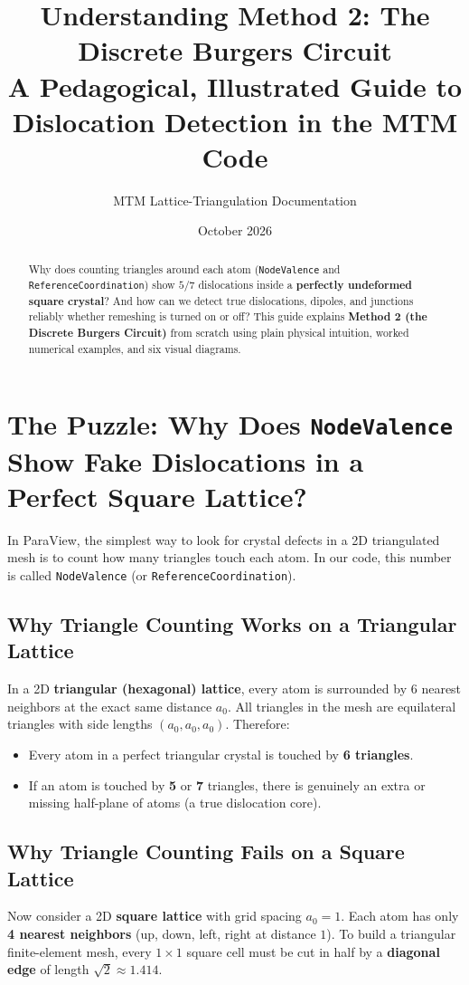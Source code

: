 \documentclass[11pt,a4paper]{article}
\title{\textbf{Understanding Method 2: The Discrete Burgers Circuit}\\[6pt]
\large A Pedagogical, Illustrated Guide to Dislocation Detection in the MTM Code}
\author{MTM Lattice-Triangulation Documentation}
\date{October 2026}
\newcommand{\code}[1]{\texttt{#1}}
\begin{document}
\maketitle

\begin{abstract}
\noindent
Why does counting triangles around each atom (\code{NodeValence} and \code{ReferenceCoordination})
show $5/7$ dislocations inside a \textbf{perfectly undeformed square crystal}? And how can we detect
true dislocations, dipoles, and junctions reliably whether remeshing is turned on or off?
This guide explains \textbf{Method 2 (the Discrete Burgers Circuit)} from scratch using plain
physical intuition, worked numerical examples, and six visual diagrams.
\end{abstract}

\tableofcontents
\newpage

\section{The Puzzle: Why Does \code{NodeValence} Show Fake Dislocations in a Perfect Square Lattice?}

In ParaView, the simplest way to look for crystal defects in a 2D triangulated mesh is to count
how many triangles touch each atom. In our code, this number is called \code{NodeValence} (or
\code{ReferenceCoordination}).

\subsection{Why Triangle Counting Works on a Triangular Lattice}
In a 2D \textbf{triangular (hexagonal) lattice}, every atom is surrounded by $6$ nearest neighbors at
the exact same distance $a_0$. All triangles in the mesh are equilateral triangles with side lengths
$(a_0, a_0, a_0)$. Therefore:
\begin{itemize}[noitemsep]
  \item Every atom in a perfect triangular crystal is touched by \textbf{6 triangles}.
  \item If an atom is touched by \textbf{5} or \textbf{7} triangles, there is genuinely an extra or
        missing half-plane of atoms (a true dislocation core).
\end{itemize}

\subsection{Why Triangle Counting Fails on a Square Lattice}
Now consider a 2D \textbf{square lattice} with grid spacing $a_0 = 1$. Each atom has only \textbf{4
nearest neighbors} (up, down, left, right at distance $1$). To build a triangular finite-element
mesh, every $1 \times 1$ square cell must be cut in half by a \textbf{diagonal edge} of length
$\sqrt{2} \approx 1.414$.
\end{document}
